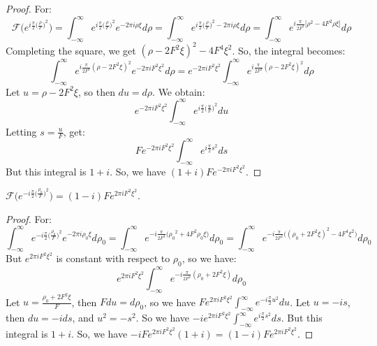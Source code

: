 \documentclass[crop=false,class=book,oneside]{standalone}
\begin{document}
            \begin{proof}
            For:
            \begin{equation*}
                \mathcal{F}\big(e^{i\frac{\pi}{2} \big(\frac{\rho}{F}\big)^2}\big) = \int_{-\infty}^{\infty} e^{i\frac{\pi}{2}\big(\frac{\rho}{F}\big)^2}e^{-2\pi i \rho \xi}d\rho = \int_{-\infty}^{\infty} e^{i\frac{\pi}{2}\big(\frac{\rho}{F}\big)^2-2\pi i \rho \xi}d\rho = \int_{-\infty}^{\infty} e^{i\frac{\pi}{2F^2}\big[\rho^2-4F^2\rho \xi\big]}d\rho    
            \end{equation*}
            Completing the square, we get $(\rho - 2F^2 \xi)^2 - 4F^4\xi^2$. So, the integral becomes:
            \begin{equation*}
                \int_{-\infty}^{\infty} e^{i\frac{\pi}{2F^2}(\rho - 2F^2\xi)^2}e^{-2\pi i F^2 \xi^2}d\rho = e^{-2\pi i F^2 \xi^2}\int_{-\infty}^{\infty} e^{i\frac{\pi}{2F^2}(\rho - 2F^2\xi)^2}d\rho
            \end{equation*}
            Let $u = \rho - 2F^2\xi$, so then $du = d\rho$. We obtain:
            \begin{equation*}
                e^{-2\pi i F^2 \xi^2}\int_{-\infty}^{\infty} e^{i\frac{\pi}{2}\big(\frac{u}{F}\big)^2}du
            \end{equation*}
            Letting $s = \frac{u}{F}$, get:
            \begin{equation*}
            Fe^{-2\pi i F^2 \xi^2} \int_{-\infty}^{\infty} e^{i\frac{\pi}{2}s^2}ds
            \end{equation*}
            But this integral is $1+i$. So, we have $(1+i)Fe^{-2\pi i F^2 \xi^2}$.
            \end{proof}
            \begin{theorem}
            $\mathcal{F}(e^{-i\frac{\pi}{2}\big(\frac{\rho_0}{F}\big)^2}\big) = (1-i)Fe^{2\pi i F^2 \xi^2}$.
            \end{theorem}
            \begin{proof}
            For:
            \begin{equation*}
                \int_{-\infty}^{\infty} e^{-i\frac{\pi}{2}\big(\frac{\rho_0}{F}\big)^2}e^{-2\pi i \rho_0 \xi}d\rho_0 = \int_{-\infty}^{\infty} e^{-i\frac{\pi}{2F^2}\big({\rho_0}^2 + 4F^2 \rho_0 \xi\big)}d\rho_0 = \int_{-\infty}^{\infty} e^{-i\frac{\pi}{2F^2}\big((\rho_0+2F^2\xi)^2 - 4F^4\xi^2\big)}d\rho_0
            \end{equation*}
            But $e^{2\pi i F^2 \xi^2}$ is constant with respect to $\rho_0$, so we have:
            \begin{equation*}
                e^{2\pi i F^2 \xi^2} \int_{-\infty}^{\infty} e^{-i\frac{\pi}{2F^2}(\rho_0+2F^2\xi)}d\rho_0    
            \end{equation*}
            Let $u = \frac{\rho_0 + 2F^2 \xi}{F}$, then $Fdu = d\rho_0$, so we have $Fe^{2\pi i F^2 \xi^2} \int_{-\infty}^{\infty} e^{-i\frac{\pi}{2}u^2}du$. Let $u = -is$, then $du = -ids$, and $u^2 = -s^2$. So we have $-i e^{2\pi i F^2 \xi^2}\int_{-\infty}^{\infty} e^{i\frac{\pi}{2}s^2}ds$. But this integral is $1+i$. So, we have $-iFe^{2\pi i F^2 \xi^2}(1+i) = (1-i)Fe^{2\pi i F^2 \xi^2}$.
            \end{proof} 
            
\end{document}

